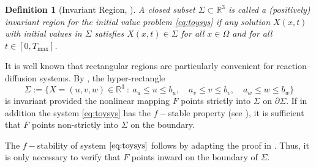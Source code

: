 \documentclass[12pt, a4paper]{amsart}
\numberwithin{equation}{section}
\newcommand{\RR}{\mathbb{R}}
\def\del{\partial}
\newtheorem{definition}[theorem]{\bf Definition}
\begin{document}
\begin{definition}[Invariant Region, \cite{Smoller1983}] A closed subset $\Sigma \subset \RR^3$ is called a (positively) invariant region for the initial value problem \eqref{eq:toysys} if any solution $X(x,t)$ with initial values in $\Sigma$ satisfies $X(x,t) \in \Sigma$ for all $x \in \Omega$ and for all $t \in [0, T_{\max}]$.
\end{definition}

It is well known that rectangular regions are particularly convenient for reaction--diffusion systems.
By \cite[Corollary 14.8, Theorem 14.11]{Smoller1983}, the hyper-rectangle 
$$\Sigma := \biggl\{ X = (u, v, w) \in \RR^3 \ : \ a_u \le u \le b_u, \quad a_v \le v \le b_v, \quad a_w \le w \le b_w \biggr\}$$
is invariant provided the nonlinear mapping $F$ points strictly into $\Sigma$ on $\del\Sigma$. 
If in addition the system \eqref{eq:toysys} has the $f-$stable property (see \cite[Definition 14.10]{Smoller1983}), it is sufficient that $F$ points non-strictly into $\Sigma$ on the boundary. 

The $f-$stability of system $\eqref{eq:toysys}$ follows by adapting the proof in \cite[Theorem 3]{Daub2013Nov}.
Thus, it is only necessary to verify that $F$ points inward on the boundary of $\Sigma$.
\end{document}
